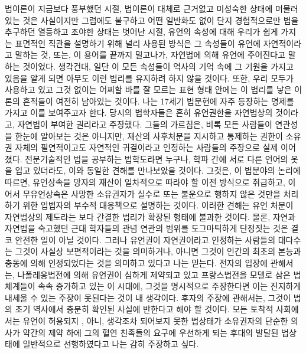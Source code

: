 법이론이 지금보다 풍부했던 시절,
법이론이 대체로 근거없고 미성숙한 상태에 머물러 있는 것은 사실이지만
그럼에도 불구하고 어떤 일반화도 없이 단지
경험적으로만 법을 추구하던 열등하고 조야한 상태는 벗어난 시절,
유언의 속성에 대해 우리가 쉽게 가지는 표면적인 직관을 설명하기 위해
널리 사용된 방식은
그 속성들이 유언에 자연적이라고 말하는 것,
또는, 이 용어를 끝까지 밀고나가,
자연법에 의해 유언에 주어진다고 말하는 것이었다.
생각건대,
일단 이 모든 속성들이
역사의 기억 속에 그 기원을 가지고 있음을 알게 되면
아무도 이런 법리를 유지하려 하지 않을 것이다.
또한,
우리 모두가 사용하고 있고
그것 없이는 어찌할 바를 잘 모르는 표현 형태 안에는
이 법리를 낳은 이론의 흔적들이
여전히 남아있는 것이다.
나는 17세기 법문헌에 자주 등장하는 명제를 가지고 이를 보여주고자 한다.
당시의 법학자들은 흔히 유언권한을 자연법상의 것이라고,
자연법이 부여한 권리라고 주장했다.
그들의 가르침은,
비록 모든 사람들이 연관성을 한눈에 알아보는 것은 아니지만,
재산의 사후처분을 지시하고 통제하는 권한이
소유권 자체의 필연적이고도 자연적인 귀결이라고
인정하는 사람들의 주장으로 실제 이어졌다.
전문기술적인 법을 공부하는 법학도라면 누구나,
학파 간에 서로 다른 언어의 옷을 입고 있더라도,
이와 동일한 견해를 만나보았을 것이다.
그것은, 이 법분야의 논리에 따르면,
%
유언상속을
망자의 재산이 일차적으로 따라야 할 이전 방식으로 취급하고,
%
이어서 무유언상속은
사망한 소유권자가 실수로 또는 불운으로
행하지 않은 것만을 처리하기 위한 입법자의 부수적 대응책으로
설명하는 것이다.
이러한 견해는 유언 처분이 자연법상의 제도라는 보다 간결한 법리가 확장된
형태에 불과한 것이다.
물론, 자연과 자연법을 숙고했던 근대 학자들의 관념 연관의 범위를
도그마틱하게 단정짓는 것은 결코 안전한 일이 아닐 것이다.
그러나 유언권이 자연권이라고 인정하는 사람들의 대다수는
그것이 사실상 보편적이라는 것을 의미하거나, 아니면
그것이 인간의 최초의 본능과 충동에 의해 인정되었다는 것을 의미하고 있다고
나는 믿는다.
전자의 입장에 관해서는,
나폴레옹법전에 의해 유언권이 심하게 제약되고 있고
프랑스법전을 모델로 삼은 법체계들이 속속 증가하고 있는 이 시대에,
그것을 명시적으로 주장한다면
이는 진지하게 내세울 수 있는 주장이 못된다는 것이 내 생각이다.
후자의 주장에 관해서는,
그것이 법의 초기 역사에서 충분히 확인된 사실에 반한다고 해야 할 것이다.
모든 토착적 사회에서는 유언이 허용되지 ,
아니, 생각조차 되어보지 못한 법상태가
소유권자의 단순한 의사가 약간의 제약 하에
그의 혈연 친족들의 요구에 우선하게 되는 후대의 발달된 법상태에
일반적으로 선행하였다고
나는 감히 주장하고 싶다.

